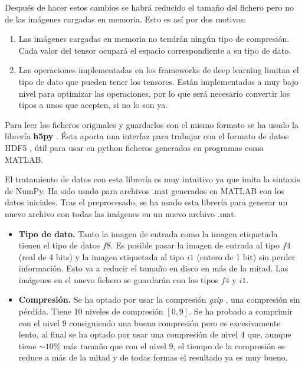 Después de hacer estos cambios se habrá reducido el tamaño del fichero pero no de las imágenes cargadas en memoria. Esto es así por dos motivos:
\begin{enumerate}
\item Las imágenes cargadas en memoria no tendrán ningún tipo de compresión. Cada valor del tensor ocupará el espacio correspondiente a su tipo de dato.
\item Las operaciones implementadas en los frameworks de deep learning limitan el tipo de dato que pueden tener los tensores. Están implementados a muy bajo nivel para optimizar las operaciones, por lo que será necesario  convertir los tipos a unos que acepten, si no lo son ya.
\end{enumerate}

Para leer los ficheros originales y guardarlos con el mismo formato se ha usado la librería  \textbf{h5py} \cite{Collette2013}. Ésta aporta una interfaz para trabajar con el formato de datos HDF5 \cite{HDFGroup20002010}, útil para usar en python ficheros generados en programas como MATLAB.

El tratamiento de datos con esta librería es muy intuitivo ya que imita la sintaxis de NumPy. Ha sido usado para archivos .mat generados en MATLAB con los datos iniciales. Tras el preprocesado, se ha usado esta librería para generar un nuevo archivo con todas las imágenes en un nuevo archivo .mat.

\begin{itemize}
\item \textbf{Tipo de dato.} Tanto la imagen de entrada como la imagen etiquetada tienen el tipo de datos $f8$. Es posible pasar la imagen de entrada al tipo $f4$ (real de 4 bits) y la imagen etiquetada al tipo $i1$ (entero de 1 bit) sin perder información. Esto va a reducir el tamaño en disco en más de la mitad. Las imágenes en el nuevo fichero se guardarán con los tipos $f4$ y $i1$.

\item \textbf{Compresión.} Se ha optado por usar la compresión \textit{gzip} \cite{Deutsch1996}, una compresión sin pérdida. Tiene 10 niveles de compresión $[0,9]$. Se ha probado a comprimir con el nivel $9$ consiguiendo una buena compresión pero es excesivamente lento, al final se ha optado por usar una compresión de nivel $4$ que, aunque tiene $\sim 10\%$ más tamaño que con el nivel $9$, el tiempo de la compresión se reduce a más de la mitad y de todas formas el resultado ya es muy bueno.
\end{itemize}

